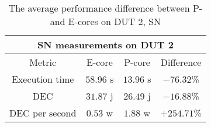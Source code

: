 \begin{table}[H]
    \centering
    \begin{tabular}{|| c | c | c | c ||}
    \hline
    \multicolumn{4}{||c||}{SN measurements on DUT 2} \\ [0.5ex] \hline\hline
    Metric & E-core & P-core & Difference \\\hline
    Execution time & $58.96$ s & $13.96$ s & $-76.32$\% \\
    DEC & $31.87$ j & $26.49$ j & $-16.88$\% \\
    DEC per second & $0.53$ w & $1.88$ w & $+254.71$\% \\\hline
    \end{tabular}
    \caption{The average performance difference between P- and E-cores on DUT 2, SN}
    \label{tab:dut-2-exp-3-sn}
\end{table}











